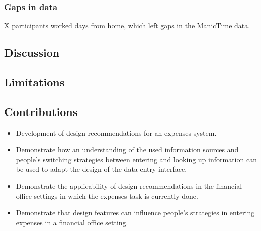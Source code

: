 \subsubsection{Gaps in data}
X participants worked days from home, which left gaps in the ManicTime data.

\subsection{Discussion}

\subsection{Limitations}

\subsection{Contributions}
\begin{itemize}
\item
Development of design recommendations for an expenses system.
\item
Demonstrate how an understanding of the used information sources and people's switching strategies between entering and looking up information can be used to adapt the design of the data entry interface. 
\item
Demonstrate the applicability of design recommendations in the financial office settings in which the expenses task is currently done. 
\item
Demonstrate that design features can influence people's strategies in entering expenses in a financial office setting.
\end{itemize}

